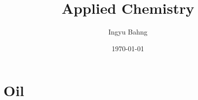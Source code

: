 \documentclass[10pt]{article}
\title{Applied Chemistry}
\date{\today}
\author{Ingyu Bahng}
\begin{document}


\section{Oil}
\end{document}
